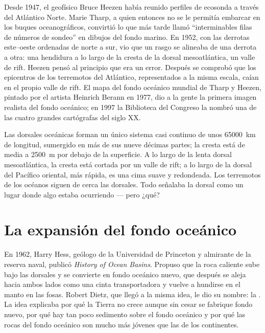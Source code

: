 \begin{history}
Desde 1947, el geofísico Bruce Heezen había reunido perfiles de ecosonda a
través del Atlántico Norte. Marie Tharp, a quien entonces no se le permitía
embarcar en los buques oceanográficos, convirtió lo que más tarde llamó
``interminables filas de números de sondeo'' en dibujos del fondo marino. En
1952, con las derrotas este--oeste ordenadas de norte a sur, vio que un rasgo
se alineaba de una derrota a otra: una hendidura a lo largo de la cresta de
la dorsal mesoatlántica, un valle de rift. Heezen pensó al principio que era
un error. Después se comprobó que los epicentros de los terremotos del
Atlántico, representados a la misma escala, caían en el propio valle de rift.
El mapa del fondo oceánico mundial de Tharp y Heezen,
pintado por el artista Heinrich Berann en 1977, dio a la gente la primera imagen realista del fondo oceánico; en 1997 la
Biblioteca del Congreso la nombró una de las cuatro grandes cartógrafas del
siglo XX.
\end{history}

Las dorsales oceánicas forman un único sistema casi continuo de unos
\qty{65000}{km} de longitud, sumergido en más de sus nueve décimas partes; la
cresta está de media a \qty{2500}{m} por debajo de la superficie. A lo largo
de la lenta dorsal mesoatlántica, la cresta está cortada por un valle de
rift; a lo largo de la dorsal del Pacífico oriental, más rápida, es una cima
suave y redondeada. Los terremotos de los océanos siguen de cerca las
dorsales. Todo señalaba la dorsal como un lugar
donde algo estaba ocurriendo --- pero ¿qué?

\section{La expansión del fondo oceánico}

\begin{history}
En 1962, Harry Hess, geólogo de la Universidad de Princeton y almirante de la
reserva naval, publicó \emph{History of Ocean Basins}.
Propuso que la roca caliente sube bajo las dorsales y se convierte en fondo
oceánico nuevo, que después se aleja hacia ambos lados como una cinta
transportadora y vuelve a hundirse en el manto en las fosas. Robert Dietz,
que llegó a la misma idea, le dio su nombre: la .
La idea explicaba por qué la Tierra no crece aunque sin cesar se fabrique
fondo nuevo, por qué hay tan poco sedimento sobre el fondo oceánico y por qué
las rocas del fondo oceánico son mucho más jóvenes que las de los
continentes.
\end{history}

